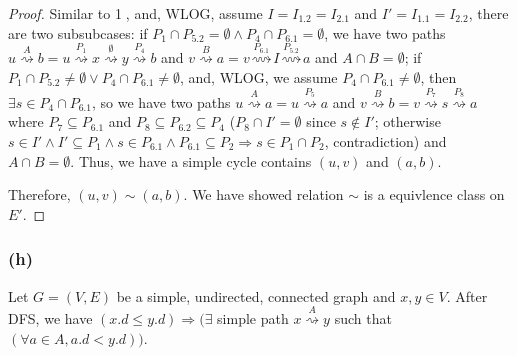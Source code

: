 \begin{proof}
    Similar to \textcircled{1},
    and, WLOG, assume $I = I_{1.2} = I_{2.1}$ and $I' = I_{1.1} = I_{2.2}$,
    there are two subsubcases: 
    if $P_1 \cap P_{5.2} = \emptyset \wedge P_4 \cap P_{6.1} = \emptyset$,
    we have two paths $u \overset{A}{\rightsquigarrow} b = u \overset{P_1}{\rightsquigarrow} x 
    \overset{\emptyset}{\rightsquigarrow} y \overset{P_4}{\rightsquigarrow} b$ and 
    $v \overset{B}{\rightsquigarrow} a = 
    v \overset{P_{6.1}}{\rightsquigarrow} I \overset{P_{5.2}}{\rightsquigarrow} a$
    and $A \cap B = \emptyset$;
    if $P_1 \cap P_{5.2} \neq \emptyset \vee P_4 \cap P_{6.1} \neq \emptyset$,
    and, WLOG, we assume $P_4 \cap P_{6.1} \neq \emptyset$,
    then $\exists s \in P_4 \cap P_{6.1}$,
    so we have two paths 
    $u \overset{A}{\rightsquigarrow} a = u \overset{P_5}{\rightsquigarrow} a$
    and $v \overset{B}{\rightsquigarrow} b = 
    v \overset{P_7}{\rightsquigarrow} s \overset{P_8}{\rightsquigarrow} a$
    where $P_7 \subseteq P_{6.1}$ and $P_8 \subseteq P_{6.2} \subseteq P_4$
    ($P_8 \cap I' = \emptyset$ since $s \notin I'$; 
    otherwise $s \in I' \wedge I' \subseteq P_1 \wedge s \in P_{6.1} \wedge P_{6.1} \subseteq P_2
    \Longrightarrow s \in P_1 \cap P_2$, contradiction)
    and $A \cap B = \emptyset$.
    Thus, we have a simple cycle contains $(u,v)$ and $(a,b)$.

    Therefore, $(u,v) \sim (a,b)$.
    We have showed relation $\sim$ is a equivlence class on $E'$.
\end{proof}

\subsubsection*{(h)}

\begin{lemma}
    Let $G = (V,E)$ be a simple, undirected, connected graph
    and $x,y \in V$.
    After DFS, we have
    $(x.d \leq y.d) \Longrightarrow (\exists$ simple path
    $x \overset{A}{\rightsquigarrow} y$
    such that $(\forall a \in A, a.d < y.d))$.
\end{lemma}

